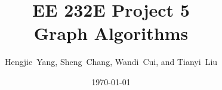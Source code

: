 \documentclass[11pt]{article}
\title{EE 232E Project 5\\Graph Algorithms}
\author{Hengjie~Yang, Sheng~Chang, Wandi~Cui, and Tianyi~Liu
}
\date{\today}
\makeatletter
\def\maxwidth{\ifdim\Gin@nat@width>\linewidth\linewidth
    \else\Gin@nat@width\fi}
\let\Oldincludegraphics\includegraphics
\renewcommand{\includegraphics}[1]{\Oldincludegraphics[width=.8\maxwidth]{#1}}
\makeatother
\begin{document}
\maketitle

\end{document}

